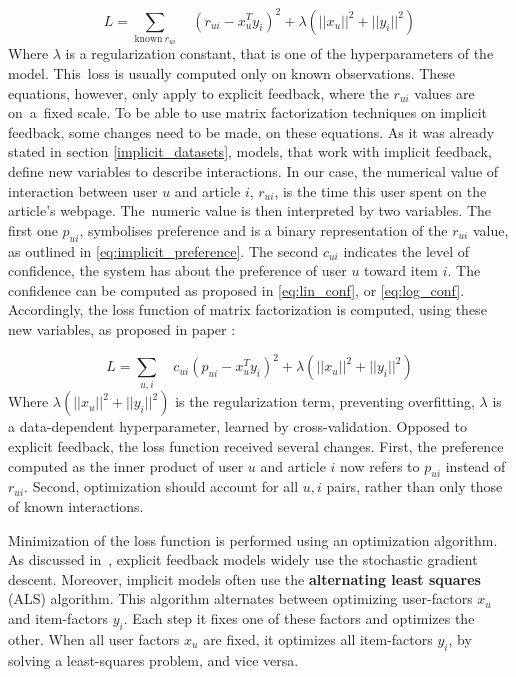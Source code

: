 \begin{equation}
    L = \sum_{\text{known}\ r_{ui}} \quad (r_{ui} - x_{u}^T y_{i})^2 + \lambda (||x_{u}||^2 + ||y_{i}||^2)
\end{equation}
Where $\lambda$ is a regularization constant, that is one of the hyperparameters of the model. This~loss is usually computed only on known observations.
These equations, however, only apply to explicit feedback, where the $r_{ui}$ values are on~a~fixed scale. To be able to use matrix factorization techniques on implicit feedback, some changes need to be made, on these equations. As it was already stated in section \ref{implicit_datasets}, models, that work with implicit feedback, define new variables to describe interactions. In our case, the numerical value of interaction between user $u$ and article $i$, $r_{ui}$, is the time this user spent on the article’s webpage. The~numeric value is then interpreted by two variables. The first one $p_{ui}$, symbolises preference and is a binary representation of the $r_{ui}$ value, as outlined in \ref{eq:implicit_preference}. The second $c_{ui}$ indicates the level of confidence, the system has about the preference of user $u$ toward item $i$. The confidence can be computed as proposed in \ref{eq:lin_conf}, or \ref{eq:log_conf}. Accordingly, the loss function of matrix factorization is computed, using these new variables, as proposed in paper \cite{Implicit}:

\begin{equation}
    L = \sum_{u,i} \quad c_{ui} (p_{ui} - x_{u}^T y_{i})^2 + \lambda (||x_{u}||^2 + ||y_{i}||^2)
\end{equation}
Where $\lambda (||x_{u}||^2 + ||y_{i}||^2)$ is the regularization term, preventing overfitting, $\lambda$ is a data-dependent hyperparameter, learned by cross-validation. Opposed to explicit feedback, the loss function received several changes. First, the preference computed as the inner product of user $u$ and article $i$ now refers to $p_{ui}$ instead of $r_{ui}$. Second, optimization should account for all $u,i$ pairs, rather than only those of known interactions.

Minimization of the loss function is performed using an optimization algorithm. As discussed in~\cite{MF}, explicit feedback models widely use the stochastic gradient descent. Moreover, implicit models often use the \textbf{alternating least squares} (ALS) algorithm. This algorithm alternates between optimizing user-factors $x_{u}$ and item-factors $y_{i}$. Each step it fixes one of these factors and optimizes the other. When all user factors $x_{u}$ are fixed, it optimizes all item-factors $y_{i}$, by solving a least-squares problem, and vice versa.


